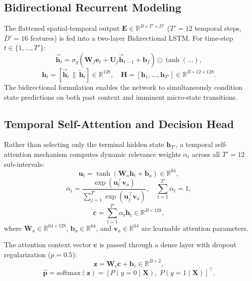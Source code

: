 \documentclass[conference]{IEEEtran}
\begin{document}
\subsection{Bidirectional Recurrent Modeling}
The flattened spatial-temporal output $\mathbf{E} \in \mathbb{R}^{B \times T' \times D'}$ ($T'=12$ temporal steps, $D'=16$ features) is fed into a two-layer Bidirectional LSTM. For time-step $t \in \{1, \dots, T'\}$:
\begin{equation}
    \overrightarrow{\mathbf{h}}_t = \sigma_g(\mathbf{W}_{f}\mathbf{e}_t + \mathbf{U}_{f}\overrightarrow{\mathbf{h}}_{t-1} + \mathbf{b}_f) \odot \tanh(\dots),
\end{equation}
\begin{equation}
    \mathbf{h}_t = \left[ \overrightarrow{\mathbf{h}}_t \,\|\, \overleftarrow{\mathbf{h}}_t \right] \in \mathbb{R}^{128}, \quad \mathbf{H} = [\mathbf{h}_1, \dots, \mathbf{h}_{T'}] \in \mathbb{R}^{B \times 12 \times 128}.
\end{equation}
The bidirectional formulation enables the network to simultaneously condition state predictions on both past context and imminent micro-state transitions.

\subsection{Temporal Self-Attention and Decision Head}
Rather than selecting only the terminal hidden state $\mathbf{h}_{T'}$, a temporal self-attention mechanism computes dynamic relevance weights $\alpha_t$ across all $T'=12$ sub-intervals:
\begin{equation}
    \mathbf{u}_t = \tanh\left( \mathbf{W}_a \mathbf{h}_t + \mathbf{b}_a \right) \in \mathbb{R}^{64},
\end{equation}
\begin{equation}
    \alpha_t = \frac{\exp(\mathbf{u}_t^\top \mathbf{v}_a)}{\sum_{j=1}^{T'} \exp(\mathbf{u}_j^\top \mathbf{v}_a)}, \quad \sum_{t=1}^{T'} \alpha_t = 1,
\end{equation}
\begin{equation}
    \mathbf{c} = \sum_{t=1}^{T'} \alpha_t \mathbf{h}_t \in \mathbb{R}^{B \times 128},
\end{equation}
where $\mathbf{W}_a \in \mathbb{R}^{64 \times 128}$, $\mathbf{b}_a \in \mathbb{R}^{64}$, and $\mathbf{v}_a \in \mathbb{R}^{64}$ are learnable attention parameters.

The attention context vector $\mathbf{c}$ is passed through a dense layer with dropout regularization ($p=0.5$):
\begin{equation}
    \mathbf{z} = \mathbf{W}_c \mathbf{c} + \mathbf{b}_c \in \mathbb{R}^{B \times 2},
\end{equation}
\begin{equation}
    \hat{\mathbf{p}} = \text{softmax}(\mathbf{z}) = \left[ P(y=0 \mid \mathbf{X}), \; P(y=1 \mid \mathbf{X}) \right]^\top.
\end{equation}
\end{document}
